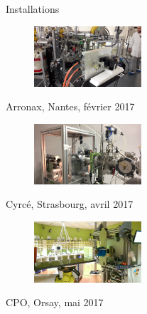 \documentclass[10pt]{beamer}
\begin{document}
\begin{frame}[fragile]{Installations}
\begin{minipage}[h]{.46\linewidth}
\begin{figure}[h]
\begin{center}
\includegraphics[width=4cm]{Dosion_Arronax.jpg} 
\end{center}
\end{figure}
\end{minipage}
\hfill
\begin{minipage}[h]{.46\linewidth}
\alert{Arronax}, Nantes, février 2017
\end{minipage}

\begin{minipage}[h]{.46\linewidth}
\begin{figure}[h]
\begin{center}
\includegraphics[width=4cm]{Dosion_Cyrce.jpg}
\end{center}
\end{figure}
\end{minipage}
\hfill
\begin{minipage}[h]{.46\linewidth}
\alert{Cyrcé}, Strasbourg, avril 2017
\end{minipage}

\begin{minipage}[h]{.46\linewidth}
\begin{figure}[h]
\begin{center}
\includegraphics[width=4cm]{Dosion_CPO.jpg}
\end{center}
\end{figure}
\end{minipage}
\hfill
\begin{minipage}[h]{.46\linewidth}
\alert{CPO}, Orsay, mai 2017
\end{minipage}
\end{frame}
\end{document}
